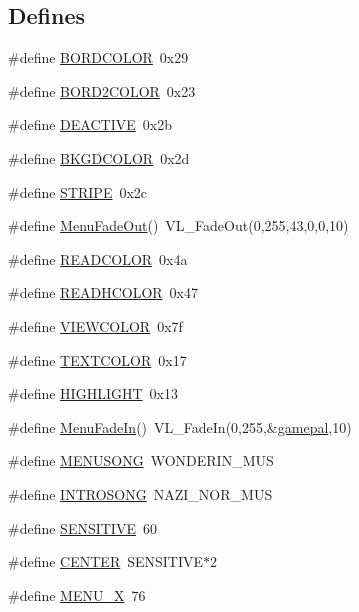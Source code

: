 \subsection*{Defines}
\begin{DoxyCompactItemize}
\item 
\#define \hyperlink{WL__MENU_8H_a9f00281077534835a9a522d628ac15d7}{BORDCOLOR}~0x29
\item 
\#define \hyperlink{WL__MENU_8H_afaff465652d15eca3b4aa4acde560e75}{BORD2COLOR}~0x23
\item 
\#define \hyperlink{WL__MENU_8H_ae038d8a4c8f14127f096f27566ef6e94}{DEACTIVE}~0x2b
\item 
\#define \hyperlink{WL__MENU_8H_acdc23edcbef7544ed85ffc9baaf0f58e}{BKGDCOLOR}~0x2d
\item 
\#define \hyperlink{WL__MENU_8H_abc0565e3e9d832a18d398bffaa8ef145}{STRIPE}~0x2c
\item 
\#define \hyperlink{WL__MENU_8H_af3ead645701acec9699bdc9822840cd8}{MenuFadeOut}()~VL\_\-FadeOut(0,255,43,0,0,10)
\item 
\#define \hyperlink{WL__MENU_8H_a9a7d817b9b9913dc74c00eb85f61cbd5}{READCOLOR}~0x4a
\item 
\#define \hyperlink{WL__MENU_8H_a30fa6a5c3fd07d3fd008bad2636a2664}{READHCOLOR}~0x47
\item 
\#define \hyperlink{WL__MENU_8H_a425bfb32e29bb949cb0b1cb76c99a76e}{VIEWCOLOR}~0x7f
\item 
\#define \hyperlink{WL__MENU_8H_a58826078218d8f7c940b9bd33b005179}{TEXTCOLOR}~0x17
\item 
\#define \hyperlink{WL__MENU_8H_ab814d2aa388b74d504673d0068cab196}{HIGHLIGHT}~0x13
\item 
\#define \hyperlink{WL__MENU_8H_a7abcebe728e405c0e69ef7df884cee84}{MenuFadeIn}()~VL\_\-FadeIn(0,255,\&\hyperlink{WL__PLAY_8C_a72ce00e98a92644d4cbf41fb10a2f7ad}{gamepal},10)
\item 
\#define \hyperlink{WL__MENU_8H_af7aa50d0848a57fd37f687618913a738}{MENUSONG}~WONDERIN\_\-MUS
\item 
\#define \hyperlink{WL__MENU_8H_aa5ff03f649da3b1c9c160967d615f572}{INTROSONG}~NAZI\_\-NOR\_\-MUS
\item 
\#define \hyperlink{WL__MENU_8H_a1df4ff7337c70fd414bdb050e2344649}{SENSITIVE}~60
\item 
\#define \hyperlink{WL__MENU_8H_a824fea1f256659e11e6cd8c82cb13338}{CENTER}~SENSITIVE$\ast$2
\item 
\#define \hyperlink{WL__MENU_8H_a8dafcd9723e98213f42d0234c20b84a5}{MENU\_\-X}~76

\end{DoxyCompactItemize}
